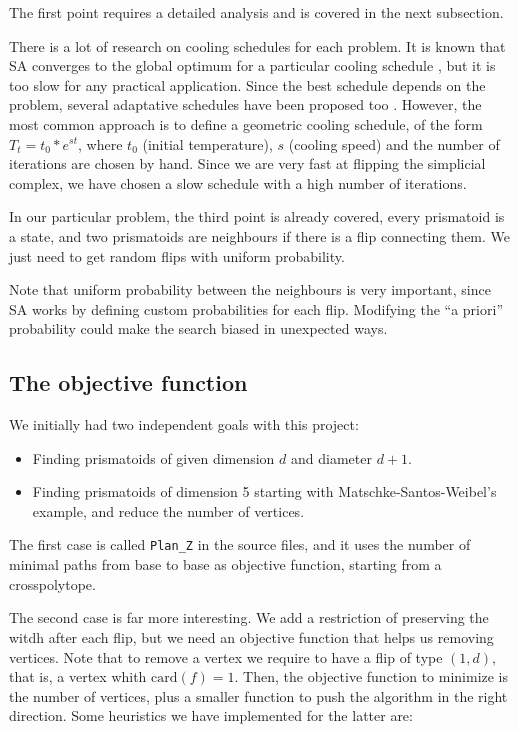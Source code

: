 \documentclass[12pt,a4paper]{article}
\theoremstyle{plain}
\theoremstyle{definition}
\begin{document}
The first point requires a detailed analysis and is covered in the next subsection.

There is a lot of research on cooling schedules for each problem. It is known that SA converges to the global optimum for a particular cooling schedule \cite{optimumSA}, but it is too slow for any practical application. Since the best schedule depends on the problem, several adaptative schedules have been proposed too \cite{adaptativeSA}. However, the most common approach is to define a geometric cooling schedule, of the form $T_t=t_0*e^{st}$, where $t_0$ (initial temperature), $s$ (cooling speed) and the number of iterations are chosen by hand. Since we are very fast at flipping the simplicial complex, we have chosen a slow schedule with a high number of iterations.

In our particular problem, the third point is already covered, every prismatoid is a state, and two prismatoids are neighbours if there is a flip connecting them. We just need to get random flips with uniform probability.

Note that uniform probability between the neighbours is very important, since SA works by defining custom probabilities for each flip. Modifying the ``a priori'' probability could make the search biased in unexpected ways.

\subsection{The objective function}

We initially had two independent goals with this project:

\begin{itemize}
  \item Finding prismatoids of given dimension $d$ and diameter $d+1$.
  \item Finding prismatoids of dimension 5 starting with Matschke-Santos-Weibel's example, and reduce the number of vertices.
\end{itemize}

The first case is called \lstinline{Plan_Z} in the source files, and it uses the number of minimal paths from base to base as objective function, starting from a crosspolytope.

The second case is far more interesting. We add a restriction of preserving the witdh after each flip, but we need an objective function that helps us removing vertices. Note that to remove a vertex we require to have a flip of type $(1,d)$, that is, a vertex whith $\text{card}(f)=1$. 
Then, the objective function to minimize is the number of vertices, plus a smaller function to push the algorithm in the right direction. Some heuristics we have implemented for the latter are:
\end{document}
